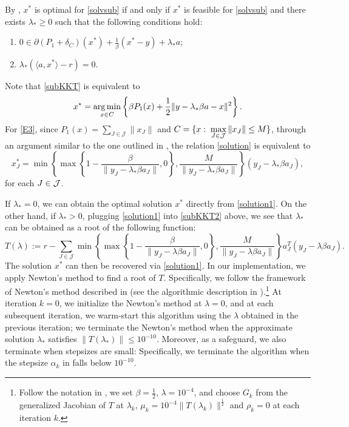 \documentclass[10pt]{article}
\numberwithin{equation}{section}
\def\argmin{\mathop{\rm arg\,min}}
\begin{document}
By \cite[Corollary~28.2.1, Theorem~28.3]{Ro70}, $x^*$ is optimal for \eqref{solvsub} if and only if $x^*$ is feasible {\color{blue} for \eqref{solvsub}} and there exists $\lambda_*\ge 0$ such that the following conditions hold:
\begin{enumerate}[{\rm (I)}]
  \item\label{subKKT}  $0\in\partial (P_1 + \delta_{C})(x^*) + \frac{1}{\beta}(x^* - y) + \lambda_*a $;
  \item\label{subKKT2}  $\lambda_*(\langle a, x^*\rangle - r)=0$.
\end{enumerate}
Note that \eqref{subKKT} is equivalent to
\begin{equation}\label{solution}
x^* = \argmin_{x\in C}\left\{\beta P_1(x) + \frac12\|y - \lambda_*\beta a - x\|^2\right\}.
\end{equation}
For \eqref{E3}, since $P_1(x) = \sum\limits_{J\in\mathcal{J}}\|x_J\|$ and $C = \{x:\; \max\limits_{J\in {\cal J}}\|x_J\|\leq M\}$, through an argument similar to the one outlined in \cite[Appendix]{LiuPo17}, the relation \eqref{solution} is equivalent to
\begin{equation}\label{solution1}
x^*_J = \min\left\{\max\left\{1 - \frac{\beta}{\|y_J - \lambda_*\beta a_J\|}, 0\right\},\frac{M}{\|y_J - \lambda_*\beta a_J\|}\right\}(y_J - \lambda_*\beta a_J),
\end{equation}
for each $J \in {\cal J}$.

If $\lambda_* = 0$, we can obtain the optimal solution $x^*$ directly from \eqref{solution1}. On the other hand, if $\lambda_* > 0$, plugging \eqref{solution1} into \eqref{subKKT2} above, we see that $\lambda_*$ can be obtained as a root of the following function:
\begin{equation}\label{G}
T(\lambda) := r- \sum_{J\in\mathcal{J}} \min\left\{\max\left\{1 - \frac{\beta}{\|y_J - \lambda\beta a_J\|}, 0\right\},\frac{M}{\|y_J - \lambda\beta a_J\|}\right\}a_J^T(y_J - \lambda\beta a_J).
\end{equation}
The solution $x^*$ can then be recovered via \eqref{solution1}. In our implementation, we apply Newton's method to find a root of $T$. Specifically, we follow the framework of Newton's method described in \cite{SoSv98} (see the algorithmic description in \cite[Algorithm~2.1]{SoSv98}).\footnote{Follow the notation in \cite[Algorithm~2.1]{SoSv98}, we set $\beta = \frac{1}{2}$, $\lambda = 10^{-4}$, and choose $G_k$ from the generalized Jacobian of $T$ at $\lambda_k$, $\mu_k = 10^{-4}\|T(\lambda_k)\|^{\frac{1}{2}}$ and $\rho_k = 0$ at each iteration $k$.} At iteration $k = 0$, we initialize the Newton's method at $\lambda = 0$, and at each subsequent iteration, we warm-start this algorithm using the $\lambda$ obtained in the previous iteration; we terminate the Newton's method when the approximate solution $\lambda_*$ satisfies $\|T(\lambda_*)\| \le 10^{-10}$. Moreover, as a safeguard, we also terminate when stepsizes are small: Specifically, we terminate the algorithm when the stepsize $\alpha_k$ in \cite[Algorithm~2.1]{SoSv98} falls below $10^{-10}$.
\end{document}
